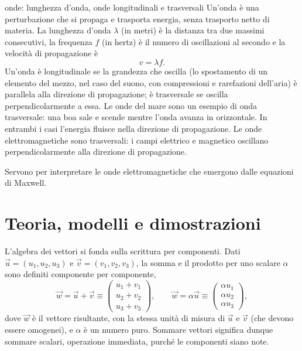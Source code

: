 \documentclass[main.tex]{subfiles}
\begin{document}
\renewcommand{\richiamoprefix}{Richiamo di Fisica 1 --- }
\begin{riquadro}{onde: lunghezza d'onda, onde longitudinali e trasversali}
Un'onda è una perturbazione che si propaga e trasporta energia, senza trasporto netto di materia. La lunghezza d'onda $\lambda$ (in metri) è la distanza tra due massimi consecutivi, la frequenza $f$ (in hertz) è il numero di oscillazioni al secondo e la velocità di propagazione è
\[
v=\lambda f .
\]
Un'onda è longitudinale se la grandezza che oscilla (lo spostamento di un elemento del mezzo, nel caso del suono, con compressioni e rarefazioni dell'aria) è parallela alla direzione di propagazione; è trasversale se oscilla perpendicolarmente a essa. Le onde del mare sono un esempio di onda trasversale: una boa sale e scende mentre l'onda avanza in orizzontale. In entrambi i casi l'energia fluisce nella direzione di propagazione. Le onde elettromagnetiche sono trasversali: i campi elettrico e magnetico oscillano perpendicolarmente alla direzione di propagazione.

Servono per interpretare le onde elettromagnetiche che emergono dalle equazioni di Maxwell.
\end{riquadro}


\section*{Teoria, modelli e dimostrazioni}
L'algebra dei vettori si fonda sulla scrittura per componenti. Dati $\vec u=(u_1,u_2,u_3)$ e $\vec v=(v_1,v_2,v_3)$, la somma e il prodotto per uno scalare $\alpha$ sono definiti componente per componente,
\[
\vec w=\vec u+\vec v\equiv\begin{pmatrix}u_1+v_1\\u_2+v_2\\u_3+v_3\end{pmatrix},\qquad
\vec w=\alpha\vec u\equiv\begin{pmatrix}\alpha u_1\\\alpha u_2\\\alpha u_3\end{pmatrix},
\]
dove $\vec w$ è il vettore risultante, con la stessa unità di misura di $\vec u$ e $\vec v$ (che devono essere omogenei), e $\alpha$ è un numero puro. Sommare vettori significa dunque sommare scalari, operazione immediata, purché le componenti siano note.
\end{document}
